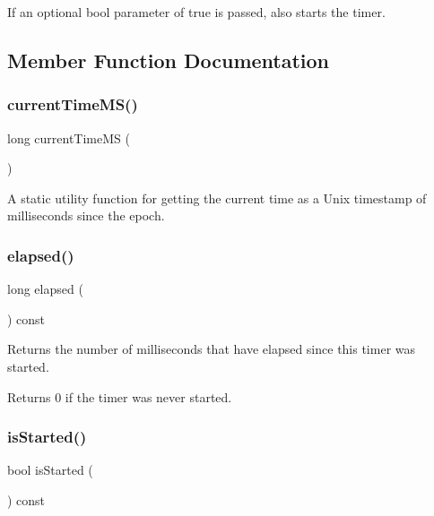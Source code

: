 If an optional bool parameter of true is passed, also starts the timer. 

\subsection{Member Function Documentation}
\mbox{\label{classTimer_a15da52f140db2287f84e933d49314a11}} 
\subsubsection{\texorpdfstring{current\+Time\+M\+S()}{currentTimeMS()}}
{\footnotesize\ttfamily long current\+Time\+MS (\begin{DoxyParamCaption}{ }\end{DoxyParamCaption})\hspace{0.3cm}{\ttfamily [static]}}



A static utility function for getting the current time as a Unix timestamp of milliseconds since the epoch. 

\mbox{\label{classTimer_a4c3fc68815831690cadc2f7cc65890fb}} 
\subsubsection{\texorpdfstring{elapsed()}{elapsed()}}
{\footnotesize\ttfamily long elapsed (\begin{DoxyParamCaption}{ }\end{DoxyParamCaption}) const}



Returns the number of milliseconds that have elapsed since this timer was started. 

Returns 0 if the timer was never started. \mbox{\label{classTimer_ac1991ea0e286fbb461b60c8c9299d781}} 
\subsubsection{\texorpdfstring{is\+Started()}{isStarted()}}
{\footnotesize\ttfamily bool is\+Started (\begin{DoxyParamCaption}{ }\end{DoxyParamCaption}) const}



